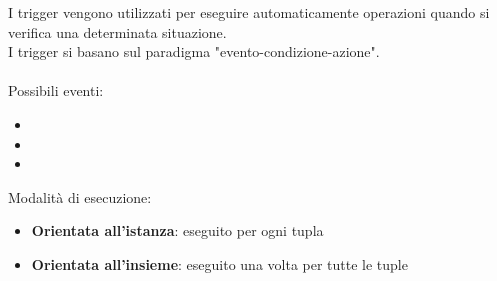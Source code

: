 I trigger vengono utilizzati per eseguire automaticamente operazioni quando si verifica una determinata situazione.\\
I trigger si basano sul paradigma "evento-condizione-azione". \vspace{2mm} \\
\vspace{4mm} \\ \noindent
Possibili eventi:
\begin{itemize}
    \item {}
    \item {}
    \item {}
\end{itemize}
\vspace{4mm} \noindent
Modalità di esecuzione:
\begin{itemize}
    \item \textbf{Orientata all'istanza}:  eseguito per ogni tupla
    \item \textbf{Orientata all'insieme}:  eseguito una volta per tutte le tuple
\end{itemize}

